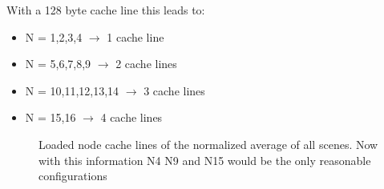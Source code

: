 With a 128 byte cache line this leads to:
\begin{itemize}
	\item[] N = 1,2,3,4 $\rightarrow$ 1 cache line
	\item[] N = 5,6,7,8,9 $\rightarrow$ 2 cache lines
	\item[] N = 10,11,12,13,14 $\rightarrow$ 3 cache lines
	\item[] N = 15,16 $\rightarrow$ 4 cache lines
\end{itemize}



\iftrue
\begin{figure}[!htb]
	\begin{minipage}[t]{0.4\textwidth} 
	\end{minipage}\hfil \hfil
	\begin{minipage}[t]{0.4\textwidth}
	\end{minipage}
	
	\caption{Loaded node cache lines of the normalized average of all scenes. Now with this information N4 N9 and N15 would be the only reasonable configurations}
\end{figure}
\fi



